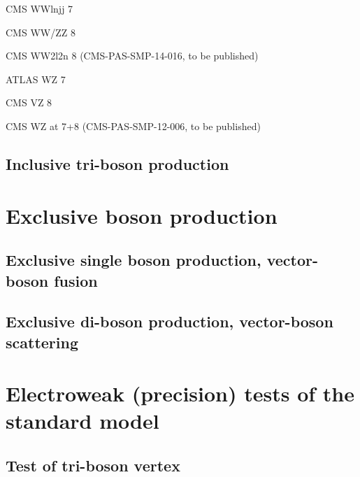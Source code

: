 \documentclass[12pt]{iopart}
\begin{document}
CMS WWlnjj 7 \TeV~\cite{Chatrchyan:2012bd}

CMS WW/ZZ 8 \TeV~\cite{Chatrchyan:2013oev}

CMS WW2l2n 8 \TeV (CMS-PAS-SMP-14-016, to be published)


ATLAS WZ 7 \TeV~\cite{Aad:2012twa}

CMS VZ 8 \TeV~\cite{Chatrchyan:2014aqa}

CMS WZ at 7+8 \TeV (CMS-PAS-SMP-12-006, to be published)













\subsection{Inclusive tri-boson production}


\section{Exclusive boson production}
\subsection{Exclusive single boson production, vector-boson fusion}


\subsection{Exclusive di-boson production, vector-boson scattering}


\section{Electroweak (precision) tests of the standard model}
\label{s-ewk-prec-tests}
\subsection{Test of tri-boson vertex}
\end{document}
